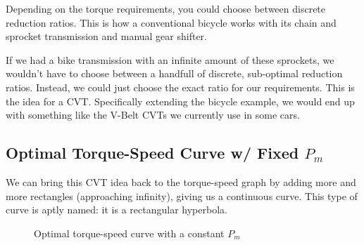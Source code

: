 \documentclass[12pt]{article}
\begin{document}
Depending on the torque requirements, you could choose between discrete reduction ratios. This is how a conventional bicycle works with its chain and sprocket transmission and manual gear shifter.

If we had a bike transmission with an infinite amount of these sprockets, we wouldn't have to choose between a handfull of discrete, sub-optimal reduction ratios. Instead, we could just choose the exact ratio for our requirements. This is the idea for a CVT. Specifically extending the bicycle example, we would end up with something like the V-Belt CVTs we currently use in some cars. 

\subsection{Optimal Torque-Speed Curve w/ Fixed $P_{m}$}

We can bring this CVT idea back to the torque-speed graph by adding more and more rectangles (approaching infinity), giving us a continuous curve. This type of curve is aptly named: it is a rectangular hyperbola.

\begin{figure}[H]
  \centering
    \caption{Optimal torque-speed curve with a constant $P_{m}$}\label{fig:optimal_power_curve}
\end{figure}
\end{document}
